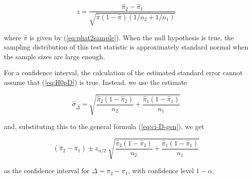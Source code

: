 \documentclass[11pt,a4paper,openany]{book}
\begin{document}
\begin{equation}z=
\frac{\hat{\pi}_{2}-\hat{\pi}_{1}}
{\sqrt{\hat{\pi}(1-\hat{\pi})(1/n_{2}+1/n_{1})}}
\label{eq:ztestDpi}\end{equation}

where \(\hat{\pi}\) is given by (\ref{eq:phat2sample}). When the null
hypothesis is true, the sampling distribution of this test statistic is
approximately standard normal when the sample sizes are large enough.

For a confidence interval, the calculation of the estimated standard
error cannot assume that (\ref{eq:H0pD}) is true. Instead, we use the
estimate

\begin{equation}\hat{\sigma}_{\hat{\Delta}} =
\sqrt{
\frac{\hat{\pi}_{2}(1-\hat{\pi}_{2})}{n_{2}} +
\frac{\hat{\pi}_{1}(1-\hat{\pi}_{1})}{n_{1}}
}
\label{eq:seDpi2}\end{equation}

and, substituting this to the general formula (\ref{eq:ci-D-gen}), we
get

\begin{equation}(\hat{\pi}_{2}-\hat{\pi}_{1}) \pm z_{\alpha/2} \;
\sqrt{
\frac{\hat{\pi}_{2}(1-\hat{\pi}_{2})}{n_{2}} +
\frac{\hat{\pi}_{1}(1-\hat{\pi}_{1})}{n_{1}}
}
\label{eq:ciDpi}\end{equation}

as the confidence interval for \(\Delta=\pi_{2}-\pi_{1}\), with
confidence level \(1-\alpha\).
\end{document}
